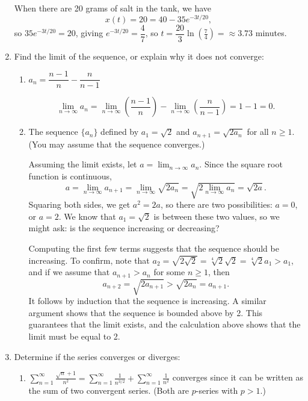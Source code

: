 \documentclass[12pt]{article}
\newcommand{\di}{\displaystyle}
\begin{document}
\begin{enumerate}
\medskip

When there are 20 grams of salt in the tank, we have 
\[
x(t)=20=40-35e^{-3t/20},
\]
so $35e^{-3t/20}=20$, giving $e^{-3t/20}=\dfrac47$, so $t=\dfrac{20}{3}\ln\left(\frac{7}{4}\right)=\approx 3.73$ minutes.
\newpage

\item Find the limit of the sequence, or explain why it does not converge:\begin{enumerate}
 \item $a_n = \dfrac{n-1}{n}-\dfrac{n}{n-1}$

\[
\lim_{n\to\infty}a_n = \lim_{n\to \infty}\left(\frac{n-1}{n}\right)-\lim_{n\to\infty}\left(\frac{n}{n-1}\right) = 1-1=0.
\]

 \item The sequence $\{a_n\}$ defined by $a_1 = \sqrt{2}$ and $a_{n+1} = \sqrt{2a_n}$ for all $n\geq 1$. (You may assume that the sequence converges.)
 
 Assuming the limit exists, let $a=\lim_{n\to\infty}a_n$. Since the square root function is continuous,
 \[
 a = \lim_{n\to\infty}a_{n+1} = \lim_{n\to\infty}\sqrt{2a_n} = \sqrt{2\lim_{n\to\infty}a_n} = \sqrt{2a}.
 \]
 Squaring both sides, we get $a^2=2a$, so there are two possibilities: $a=0$, or $a=2$. We know that $a_1=\sqrt{2}$ is between these two values, so we might ask: is the sequence increasing or decreasing?
 
Computing the first few terms suggests that the sequence should be increasing. To confirm, note that $a_2 = \sqrt{2\sqrt{2}}=\sqrt[4]{2}\sqrt{2} = \sqrt[4]{2}a_1>a_1$, and if we assume that $a_{n+1}>a_n$ for some $n\geq 1$, then
\[
a_{n+2} = \sqrt{2a_{n+1}}>\sqrt{2a_n} = a_{n+1}.
\]
It follows by induction that the sequence is increasing. A similar argument shows that the sequence is bounded above by 2. This guarantees that the limit exists, and the calculation above shows that the limit must be equal to 2.
 
\end{enumerate}
\item Determine if the series converges or diverges:
\begin{enumerate}

 \item $\di \sum_{n=1}^\infty \frac{\sqrt{n}+1}{n^2} = \sum_{n=1}^\infty \frac{1}{n^{3/2}} +\sum_{n=1}^\infty \frac{1}{n^2}$ converges since it can be written as the sum of two convergent series. (Both are $p$-series with $p>1$.)




\end{enumerate}
\end{enumerate}
\end{document}
